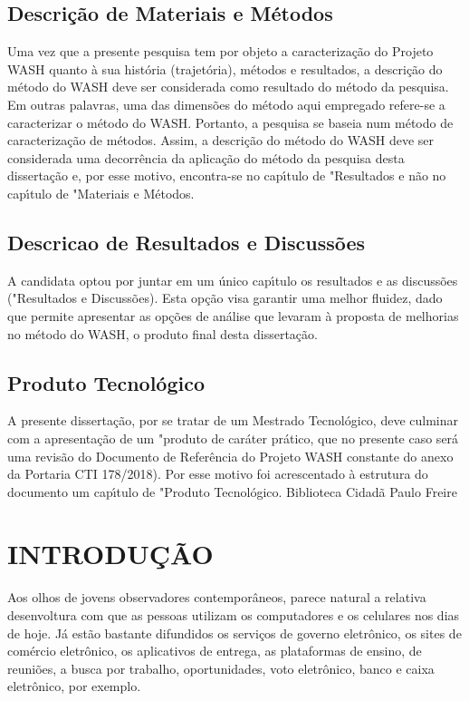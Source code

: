 \documentclass[
12pt,		%
openright,	%
twoside,  %
a4paper,			%
chapter=TITLE,		%
english,			%
french,				%
spanish,			%
brazil				%
]{USPSC-classe/USPSC}
\begin{document}
\section[Descri\c{c}\~ao de Materiais e M\'etodos]{Descri\c{c}\~ao de Materiais e M\'etodos}\label{Descri\c{c}\~ao de Materiais e M\'etodos}
Uma vez que a presente pesquisa tem por objeto a caracteriza\c{c}\~ao do Projeto WASH quanto \`a sua hist\'oria (trajet\'oria), m\'etodos e resultados, a descri\c{c}\~ao do m\'etodo do WASH deve ser considerada como resultado do m\'etodo da pesquisa. Em outras palavras, uma das dimens\~oes do m\'etodo aqui empregado refere-se a caracterizar o m\'etodo do WASH. Portanto, a pesquisa se baseia num m\'etodo de caracteriza\c{c}\~ao de m\'etodos. Assim, a descri\c{c}\~ao do m\'etodo do WASH deve ser considerada uma decorr\^encia da aplica\c{c}\~ao do m\'etodo da pesquisa desta disserta\c{c}\~ao e, por esse motivo, encontra-se no cap\'{\i}tulo de "Resultados e n\~ao no cap\'{\i}tulo de "Materiais e M\'etodos. 




\section[Descricao de Resultados e Discuss\~oes]{Descricao de Resultados e Discuss\~oes}\label{Descricao de Resultados e Discuss\~oes}
A candidata optou por juntar em um \'unico cap\'{\i}tulo os resultados e as discuss\~oes ("Resultados e Discuss\~oes). Esta op\c{c}\~ao visa garantir uma melhor fluidez, dado que permite apresentar as op\c{c}\~oes de an\'alise que levaram \`a proposta de melhorias no m\'etodo do WASH, o produto final desta disserta\c{c}\~ao. 




\section[Produto Tecnol\'ogico]{Produto Tecnol\'ogico}\label{Produto Tecnol\'ogico}
A presente disserta\c{c}\~ao, por se tratar de um Mestrado Tecnol\'ogico, deve culminar com a apresenta\c{c}\~ao de um "produto de car\'ater pr\'atico, que no presente caso ser\'a uma revis\~ao do Documento de Refer\^encia do Projeto WASH  constante do anexo da  Portaria CTI 178/2018). Por esse motivo foi acrescentado \`a estrutura do documento um cap\'{\i}tulo de "Produto Tecnol\'ogico. Biblioteca Cidad\~a Paulo Freire




\chapter[INTRODU\c{C}\~AO]{INTRODU\c{C}\~AO}\label{INTRODU\c{C}\~AO}
Aos olhos de jovens observadores contempor\^aneos, parece natural a relativa desenvoltura com que as pessoas utilizam os computadores e os celulares nos dias de hoje. J\'a est\~ao bastante difundidos os servi\c{c}os de governo eletr\^onico, os sites de com\'ercio eletr\^onico, os  aplicativos de entrega, as plataformas de ensino, de reuni\~oes, a busca por  trabalho, oportunidades, voto eletr\^onico, banco e caixa eletr\^onico, por exemplo.
\end{document}
